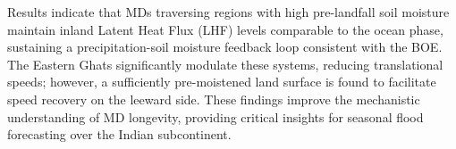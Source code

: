   \vspace{0.2cm}

  \noindent Results indicate that MDs traversing regions with high
  pre-landfall soil moisture maintain inland Latent Heat Flux (LHF)
  levels comparable to the ocean phase, sustaining a
  precipitation-soil moisture feedback loop consistent with the BOE.
  The Eastern Ghats significantly modulate these systems, reducing
  translational speeds; however, a sufficiently pre-moistened land
  surface is found to facilitate speed recovery on the leeward side.
  These findings improve the mechanistic understanding of MD
  longevity, providing critical insights for seasonal flood
  forecasting over the Indian subcontinent.

\vfill
